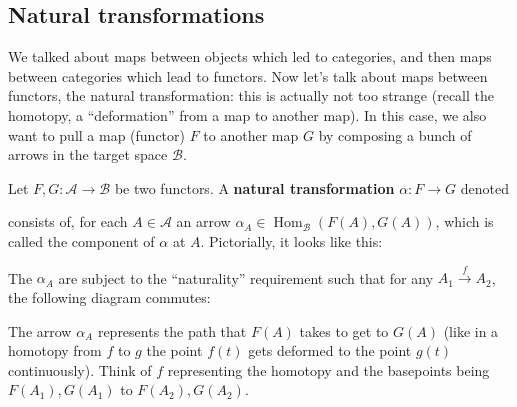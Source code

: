 \subsection{Natural transformations}
We talked about maps between objects which led to categories, and then maps between categories which lead to functors. Now let's talk about maps between functors, the natural transformation: this is actually not too strange (recall the homotopy, a ``deformation'' from a map to another map).
In this case, we also want to pull a map (functor) $F$ to another map $G$ by composing a bunch of arrows in the target space $\mathcal{B}$.
\begin{definition}
    Let $F,G \colon \mathcal{A} \to \mathcal{B}$ be two functors. A \textbf{natural transformation} $\alpha \colon F \to G$ denoted
            \begin{figure}[H]
                \centering
            \end{figure}
            consists of, for each $A\in \mathcal{A}$ an arrow $\alpha_A \in \operatorname{Hom}_{\mathcal{B}}(F(A),G(A))$, which is called the component of $\alpha$ at $A$. 
            Pictorially, it looks like this: 
            \begin{figure}[H]
                \centering
            \end{figure}
            The $\alpha_A$ are subject to the ``naturality'' requirement such that for any $A_1 \overset{f}{\to }A_2$, the following diagram commutes:
            \begin{figure}[H]
                \centering
            \end{figure}
            The arrow $\alpha_A$ represents the path that $F(A)$ takes to get to $G(A)$ (like in a homotopy from $f$ to $g$ the point $f(t)$ gets deformed to the point $g(t)$ continuously). Think of $f$ representing the homotopy and the basepoints being $F(A_1),G(A_1)$ to $F(A_2),G(A_2)$.
\end{definition}
